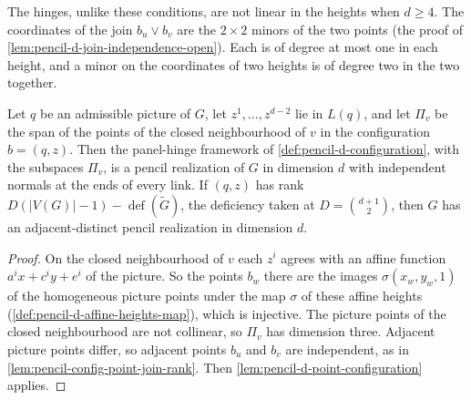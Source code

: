 The hinges, unlike these conditions, are not linear in the heights when
$d \ge 4$. The coordinates of the join $b_u \vee b_v$ are the
$2 \times 2$ minors of the two points (the proof of
\cref{lem:pencil-d-join-independence-open}). Each is of degree at most
one in each height, and a minor on the coordinates of two heights is of
degree two in the two together.

\begin{lemma}
  \label{lem:pencil-d-config-realization}
  \leanok
  Let $q$ be an admissible picture of $G$, let $z^1, \dots, z^{d-2}$ lie
  in $L(q)$, and let $\Pi_v$ be the span of the points of the closed
  neighbourhood of $v$ in the configuration $b = (q, z)$. Then the
  panel-hinge framework of \cref{def:pencil-d-configuration}, with the
  subspaces $\Pi_v$, is a pencil realization of $G$ in dimension $d$
  with independent normals at the ends of every link. If $(q, z)$ has
  rank $D(|V(G)| - 1) - \operatorname{def}(\tilde G)$, the deficiency
  taken at $D = \binom{d+1}{2}$, then $G$ has an adjacent-distinct pencil
  realization in dimension $d$.
\end{lemma}
\begin{proof}
  \leanok
  On the closed neighbourhood of $v$ each $z^i$ agrees with an affine
  function $a^i x + c^i y + e^i$ of the picture. So the points $b_w$ there
  are the images $\sigma(x_w, y_w, 1)$ of the homogeneous picture points
  under the map $\sigma$ of these affine heights
  (\cref{def:pencil-d-affine-heights-map}), which is injective. The
  picture points of the closed neighbourhood are not collinear, so
  $\Pi_v$ has dimension three.
  Adjacent picture points differ, so adjacent points $b_u$ and $b_v$ are
  independent, as in \cref{lem:pencil-config-point-join-rank}. Then
  \cref{lem:pencil-d-point-configuration} applies.
\end{proof}

